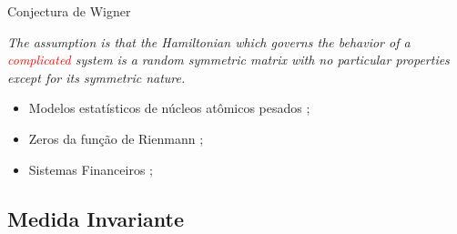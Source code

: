 \begin{frame}
	\begin{block}{Conjectura de Wigner}
		\parbox{\linewidth}{\textit{The assumption is that
			the Hamiltonian which governs the behavior of
			a \textcolor{red}{complicated} system is a random symmetric
			matrix with no particular properties except for
			its symmetric nature.}}
	\end{block}

	\vspace{1cm}

	\pause
	\begin{itemize}
		\item Modelos estatísticos de núcleos atômicos pesados \cite{Wigner};
		\item Zeros da função de Rienmann \cite{montgomery};
		\item Sistemas Financeiros \cite[Chapter~2]{fabozziquantitative};
	\end{itemize}
	
	
\end{frame}


\subsection{Medida Invariante}

